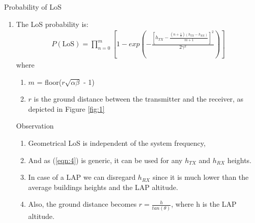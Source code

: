\documentclass{beamer}
\begin{document}
\begin{frame}{Probability of LoS}
\begin{enumerate}
    \item The LoS probability  is:
\begin{align}
    P(\text{LoS}) = \prod_{n=0}^{m} \left[ 1- exp\left( - \frac{\left[ h_{TX} - \frac{\left(n+\frac{1}{2} \right) \left( h_{TX}-h_{RX} \right)}{m+1}\right]^2}{2\gamma^2}\right) \right]
    \label{eqn:4}
\end{align}
where 
\begin{enumerate}
    \item $m$ = floor($r\sqrt{\alpha\beta}$ - 1) 
    \item $r$ is the ground distance between the transmitter and the receiver, as depicted in Figure \ref{fig:1}
\end{enumerate}
\begin{block}{Observation}
\begin{enumerate}
   \item Geometrical LoS is independent of the system frequency,
   \item And as (\ref{eqn:4}) is generic, it can be used for any $h_{TX}$ and $h_{RX}$
heights. 
  \item In case of a LAP we can disregard $h_{RX}$ since it is much lower than the average buildings heights and the LAP altitude.
  \item Also, the ground distance becomes $r = \frac{h}{ tan(\theta)}$, where h is the LAP
altitude.
\end{enumerate}
\end{block}

\end{enumerate}
\end{frame}
\end{document}
